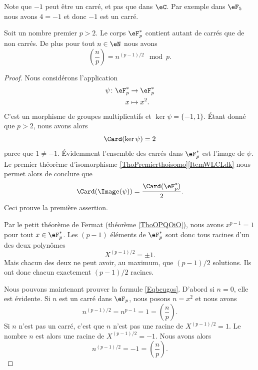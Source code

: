 Note que \( -1\) peut être un carré, et pas que dans \( \eC\). Par exemple dans \( \eF_5\) nous avons \( 4=-1\) et donc \( -1\) est un carré.

\begin{proposition} \label{PropcGsJjk}
    Soit un nombre premier \( p>2\). Le corps \( \eF_p^*\) contient autant de carrés que de non carrés. De plus pour tout \( n\in \eN\) nous avons
    \begin{equation}    \label{Eqbcugos}
        \left(\frac{n}{p}\right)=n^{(p-1)/2}\mod p.
    \end{equation}
\end{proposition}

\begin{proof}
    Nous considérons l'application 
    \begin{equation}
        \begin{aligned}
            \psi\colon \eF^*_p&\to \eF^*_p \\
            x&\mapsto x^2. 
        \end{aligned}
    \end{equation}
    C'est un morphisme de groupes multiplicatifs et \( \ker\psi=\{ -1,1 \}\). Étant donné que \( p>2\), nous avons alors
    \begin{equation}
        \Card(\ker\psi)=2
    \end{equation}
    parce que \( 1\neq -1\). Évidemment l'ensemble des carrés dans \( \eF^*_p\) est l'image de \( \psi\). Le premier théorème d'isomorphisme \ref{ThoPremierthoisomo}\ref{ItemWLCLdk} nous permet alors de conclure que
    \begin{equation}
        \Card(\Image(\psi))=\frac{ \Card(\eF^*_p) }{2}.
    \end{equation}
    Ceci prouve la première assertion.

    Par le petit théorème de Fermat (théorème \ref{ThoOPQOiO}), nous avons \( x^{p-1}=1\) pour tout \( x\in \eF^*_p\). Les \( (p-1)\) éléments de \( \eF^*_p\) sont donc tous racines d'un des deux polynômes
    \begin{equation}
        X^{(p-1)/2}=\pm 1.
    \end{equation}
    Mais chacun des deux ne peut avoir, au maximum, que \( (p-1)/2\) solutions. Ils ont donc chacun exactement \( (p-1)/2\) racines.

    Nous pouvons maintenant prouver la formule \eqref{Eqbcugos}. D'abord si \( n=0\), elle est évidente. Si \( n\) est un carré dans \( \eF_p\), nous posons \( n=x^2\) et nous avons
    \begin{equation}
        n^{(p-1)/2}=n^{p-1}=1=\left(\frac{n}{p}\right).
    \end{equation}
    Si \( n\) n'est pas un carré, c'est que \( n\) n'est pas une racine de \( X^{(p-1)/2}=1\). Le nombre \( n\) est alors une racine de \( X^{(p-1)/2}=-1\). Nous avons alors
    \begin{equation}
        n^{(p-1)/2}=-1=\left(\frac{n}{p}\right).
    \end{equation}
\end{proof}

